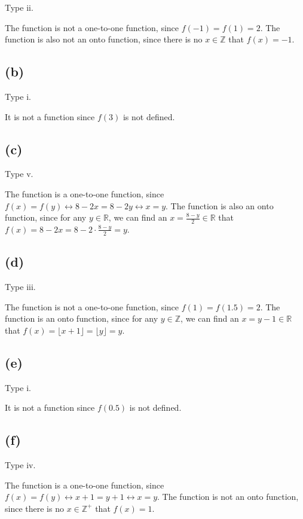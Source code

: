\documentclass[a4paper,12pt]{article}
\begin{document}
Type ii.

The function is not a one-to-one function, since $f(-1) = f(1) = 2$.
The function is also not an onto function, since there is no $x \in \mathbb{Z}$ that $f(x) = -1$.

\subsection*{(b)}

Type i.

It is not a function since $f(3)$ is not defined.

\subsection*{(c)}

Type v.

The function is a one-to-one function, since $f(x) = f(y) \leftrightarrow 8 - 2x = 8 - 2y \leftrightarrow x = y$.
The function is also an onto function, since for any $y \in \mathbb{R}$, we can find an $x = \frac{8 - y}{2} \in \mathbb{R}$ that $f(x) = 8 - 2x = 8 - 2 \cdot \frac{8 - y}{2} = y$.

\subsection*{(d)}

Type iii.

The function is not a one-to-one function, since $f(1) = f(1.5) = 2$.
The function is an onto function, since for any $y \in \mathbb{Z}$, we can find an $x = y - 1 \in \mathbb{R}$ that $f(x) = \lfloor x + 1 \rfloor = \lfloor y \rfloor = y$.

\subsection*{(e)}

Type i.

It is not a function since $f(0.5)$ is not defined.

\subsection*{(f)}

Type iv.

The function is a one-to-one function, since $f(x) = f(y) \leftrightarrow x + 1 = y + 1 \leftrightarrow x = y$.
The function is not an onto function, since there is no $x \in \mathbb{Z}^+$ that $f(x) = 1$.
\end{document}
